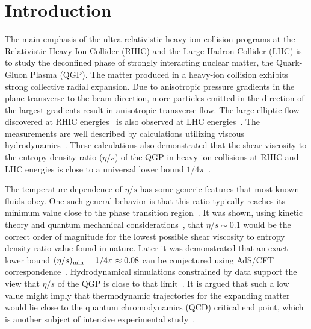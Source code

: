 
\section{Introduction}
\label{sec:intro}
The main emphasis of the ultra-relativistic heavy-ion collision programs at the Relativistic Heavy Ion Collider (RHIC) and the Large Hadron Collider (LHC) is to study the deconfined phase of strongly interacting nuclear matter, the Quark-Gluon Plasma (QGP). 
The matter produced in a heavy-ion collision exhibits strong collective radial expansion. Due to anisotropic pressure gradients in the plane transverse to the beam direction, more particles emitted in the direction of the largest gradients result in anisotropic transverse flow.
The large elliptic flow discovered at RHIC energies~\cite{Ackermann:2000tr} is also observed at LHC energies~\cite{Aamodt:2010pa,Adam:2016izf}. The measurements are well described by calculations utilizing viscous hydrodynamics~\cite{Romatschke:2007mq,Shen:2011eg,Schenke:2011zz,Bozek:2012qs,Gale:2012rq,Hirano:2010je}.
These calculations also demonstrated that the shear viscosity to the entropy density ratio ($\eta/s$) of the QGP in heavy-ion collisions at RHIC and LHC energies is close to a universal lower bound $1/4\pi$~\cite{Kovtun:2004de}.

The temperature dependence of $\eta/s$ has some generic features that most known fluids obey. One such general behavior is that this ratio typically reaches its minimum value close to the phase transition region~\cite{Lacey:2006bc}. 
It was shown, using kinetic theory and quantum mechanical considerations~\cite{PhysRevD.31.53}, that $\eta/s\sim0.1$ would be the correct order of magnitude for the lowest possible shear viscosity to entropy density ratio value found in nature. Later it was demonstrated that an exact lower bound $(\eta/s)_{\rm min}=1/4\pi\approx0.08$ can be conjectured using AdS/CFT correspondence~\cite{Kovtun:2004de}. Hydrodynamical simulations constrained by data support the view that $\eta/s$ of the QGP is close to that limit~\cite{Gale:2012rq}.
It is argued that such a low value might imply that thermodynamic trajectories for the expanding matter would lie close to the quantum chromodynamics (QCD) critical end point, which is another subject of intensive experimental study~\cite{Lacey:2006bc,Csernai:2006zz}.

